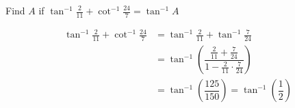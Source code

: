 
%
%
%
%
% 
% 

\question Find $A$ if $\tan^{-1} \frac{2}{11} + \cot^{-1}\frac{24}{7} = \tan^{-1} A$

\insertQR{}

\ifprintanswers
\fi 

\begin{solution}
	\begin{align}
	    \tan^{-1}\frac{2}{11} + \cot^{-1}\frac{24}{7} &= \tan^{-1}\frac{2}{11} + \tan^{-1}\frac{7}{24} \\
	      &= \tan^{-1}\left(\dfrac{\frac{2}{11} + \frac{7}{24}}{1-\frac{2}{11}\cdot\frac{7}{24}}\right) \\
	      &= \tan^{-1}\left(\dfrac{125}{150}\right) = \tan^{-1}\left(\dfrac{1}{2}\right)
	\end{align}
\end{solution}
